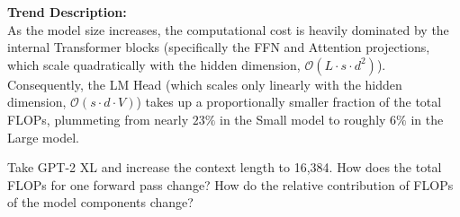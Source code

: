 \begin{answerbox}
    \vspace{0.5em}
    \textbf{Trend Description:} \\
    As the model size increases, the computational cost is heavily dominated by the internal Transformer blocks (specifically the FFN and Attention projections, which scale quadratically with the hidden dimension, $\mathcal{O}(L \cdot s \cdot d^2)$). Consequently, the LM Head (which scales only linearly with the hidden dimension, $\mathcal{O}(s \cdot d \cdot V)$) takes up a proportionally smaller fraction of the total FLOPs, plummeting from nearly $23\%$ in the Small model to roughly $6\%$ in the Large model.

    \vspace{0.5em}
    \rule{0pt}{1.5em}
\end{answerbox}



\begin{questionbox}
    Take GPT-2 XL and increase the context length to 16,384. How does the total FLOPs for one forward pass change? How do the relative contribution of FLOPs of the model components change?
\end{questionbox}

